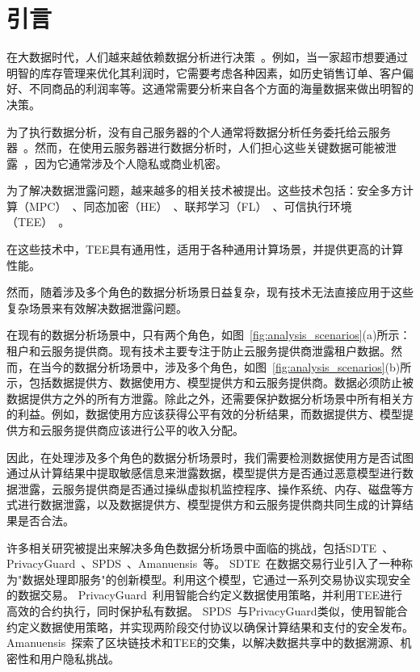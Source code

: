 \section{引言}
在大数据时代，人们越来越依赖数据分析进行决策~\cite{albright2020business}。例如，当一家超市想要通过明智的库存管理来优化其利润时，它需要考虑各种因素，如历史销售订单、客户偏好、不同商品的利润率等。这通常需要分析来自各个方面的海量数据来做出明智的决策。

为了执行数据分析，没有自己服务器的个人通常将数据分析任务委托给云服务器~\cite{sandhu2021big}。然而，在使用云服务器进行数据分析时，人们担心这些关键数据可能被泄露~\cite{purohit2013data}，因为它通常涉及个人隐私或商业机密。

为了解决数据泄露问题，越来越多的相关技术被提出。这些技术包括：安全多方计算（MPC）~\cite{lindell2020secure,patra2021aby2,dalskov2022fast}、同态加密（HE）~\cite{marcolla2022survey,lu2021pegasus,bossuat2021efficient}、联邦学习（FL）~\cite{li2021survey,bonawitz2017practical,shayan2020biscotti}、可信执行环境（TEE）~\cite{zheng2021survey,tsai2017graphene,priebe2018enclavedb}。

在这些技术中，TEE具有通用性，适用于各种通用计算场景，并提供更高的计算性能。

然而，随着涉及多个角色的数据分析场景日益复杂，现有技术无法直接应用于这些复杂场景来有效解决数据泄露问题。

在现有的数据分析场景中，只有两个角色，如图~\ref{fig:analysis_scenarios}(a)所示：租户和云服务提供商。现有技术主要专注于防止云服务提供商泄露租户数据。然而，在当今的数据分析场景中，涉及多个角色，如图~\ref{fig:analysis_scenarios}(b)所示，包括数据提供方、数据使用方、模型提供方和云服务提供商。数据必须防止被数据提供方之外的所有方泄露。除此之外，还需要保护数据分析场景中所有相关方的利益。例如，数据使用方应该获得公平有效的分析结果，而数据提供方、模型提供方和云服务提供商应该进行公平的收入分配。

因此，在处理涉及多个角色的数据分析场景时，我们需要检测数据使用方是否试图通过从计算结果中提取敏感信息来泄露数据，模型提供方是否通过恶意模型进行数据泄露，云服务提供商是否通过操纵虚拟机监控程序、操作系统、内存、磁盘等方式进行数据泄露，以及数据提供方、模型提供方和云服务提供商共同生成的计算结果是否合法。

许多相关研究被提出来解决多角色数据分析场景中面临的挑战，包括SDTE~\cite{dai2019sdte}、PrivacyGuard~\cite{xiao2020privacyguard}、SPDS~\cite{wang2020spds}、Amanuensis~\cite{hardin2022amanuensis}等。
SDTE~\cite{dai2019sdte}在数据交易行业引入了一种称为"数据处理即服务"的创新模型。利用这个模型，它通过一系列交易协议实现安全的数据交易。
PrivacyGuard~\cite{xiao2020privacyguard}利用智能合约定义数据使用策略，并利用TEE进行高效的合约执行，同时保护私有数据。
SPDS~\cite{wang2020spds}与PrivacyGuard类似，使用智能合约定义数据使用策略，并实现两阶段交付协议以确保计算结果和支付的安全发布。
Amanuensis~\cite{hardin2022amanuensis}探索了区块链技术和TEE的交集，以解决数据共享中的数据溯源、机密性和用户隐私挑战。

